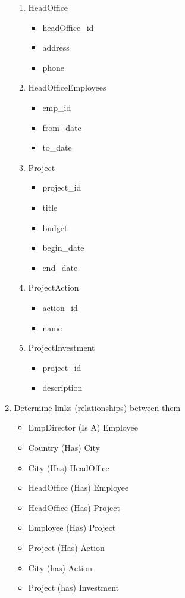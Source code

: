 \documentclass[]{article}
\begin{document}
\begin{enumerate}
\begin{enumerate}
\item HeadOffice
\begin{itemize}
\item headOffice\_id
\item address
\item phone
\end{itemize}

\item HeadOfficeEmployees
\begin{itemize}
\item emp\_id
\item from\_date
\item to\_date
\end{itemize}

\item Project
\begin{itemize}
\item project\_id
\item title
\item budget
\item begin\_date
\item end\_date
\end{itemize}

\item ProjectAction
\begin{itemize}
\item action\_id
\item name
\end{itemize}

\item ProjectInvestment
\begin{itemize}
\item project\_id
\item description
\end{itemize}
\end{enumerate}

\item Determine links (relationships) between them

\begin{itemize}
\item EmpDirector (Is A) Employee
\item Country (Has) City
\item City (Has) HeadOffice
\item HeadOffice (Has) Employee
\item HeadOffice (Has) Project
\item Employee (Has) Project
\item Project (Has) Action
\item City (has) Action
\item Project (has) Investment
\end{itemize}


\end{enumerate}
\end{document}
